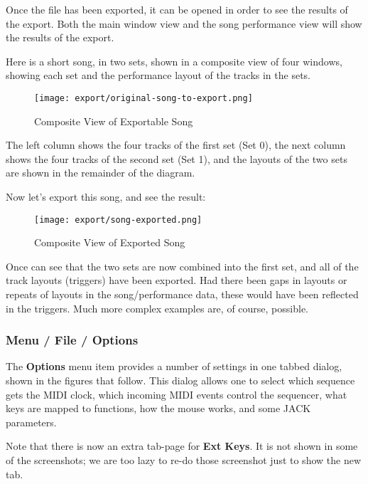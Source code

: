    Once the file has been exported, it can be opened in order to see
   the results of the export.  Both the main window view and the
   song performance view will show the results of the export.

   Here is a short song, in two sets, shown in a composite view of four windows,
   showing each set and the performance layout of the tracks in the sets.

\begin{figure}[H]
   \centering 
   \texttt{[image: export/original-song-to-export.png]}
   \caption{Composite View of Exportable Song}
   \label{fig:seq64_original_song_to_export}
\end{figure}

   The left column shows the four tracks of the first set (Set 0), the next
   column shows the four tracks of the second set (Set 1), and the
   layouts of the two sets are shown in the remainder of the diagram.

   Now let's export this song, and see the result:

\begin{figure}[H]
   \centering 
   \texttt{[image: export/song-exported.png]}
   \caption{Composite View of Exported Song}
   \label{fig:seq64_song_exported}
\end{figure}

   Once can see that the two sets are now combined into the first set,
   and all of the track layouts (triggers) have been exported.
   Had there been gaps in layouts or repeats of layouts in the song/performance
   data, these would have been reflected in the triggers.
   Much more complex examples are, of course, possible.

\subsubsection{Menu / File / Options}
\label{subsubsec:seq64_menu_file_options}

   The \textbf{Options} menu item provides a number of settings in one
   tabbed dialog, shown in the figures that follow.
   This dialog allows one to select which sequence gets the MIDI
   clock, which incoming MIDI events control the sequencer, what keys are
   mapped to functions, how the mouse works, and some JACK parameters.

   Note that there is now an extra tab-page for \textbf{Ext Keys}.
   It is not shown in some of the screenshots; we are too lazy to re-do those
   screenshot just to show the new tab.

